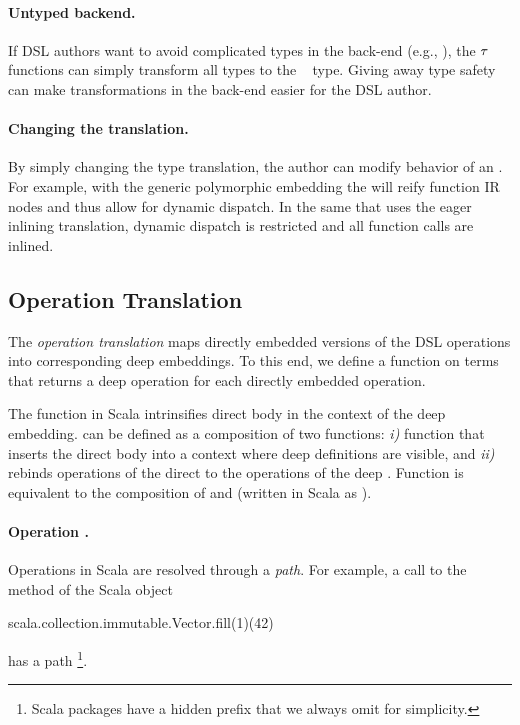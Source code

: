 \paragraph{Untyped backend.} If DSL authors want to avoid complicated types in the back-end (e.g., ), the $\tau$ functions can simply transform all types to the ~\cite{abadi_dynamic_1991} type. Giving away type safety can make transformations in the back-end easier for the DSL author.

\paragraph{Changing the translation.} By simply changing the type translation, the \edsl author can modify behavior of an \edsl.  For example, with the generic polymorphic embedding the \edsl will reify function IR nodes and thus allow for dynamic dispatch. In the same \edsl that uses the eager inlining translation, dynamic dispatch is restricted and all function calls are inlined.

\subsection{Operation Translation}
\label{sec:operation-translation}

The \emph{operation translation} maps directly embedded versions of the
  DSL operations into corresponding deep embeddings. To this end, we define a
  function  on terms that returns a deep operation for each directly
  embedded operation.

The  function in Scala intrinsifies direct \edsl body in the context of the deep embedding.
  can be defined as a composition of two functions: \emph{i)} function  that inserts the direct \edsl body
  into a context where deep \edsl definitions are visible, and \emph{ii)} 
  rebinds operations of the direct \edsl to the operations of the deep \edsl. Function  is equivalent to
  the composition of  and  (written in Scala as ).

\paragraph{Operation .} Operations in Scala are resolved through a \emph{path}. For example, a call to the  method
  of the Scala object \begin{lstparagraph}
scala.collection.immutable.Vector.fill(1)(42)
\end{lstparagraph}
  has a path \footnote{Scala packages have a hidden prefix  that we always omit for simplicity.}.

